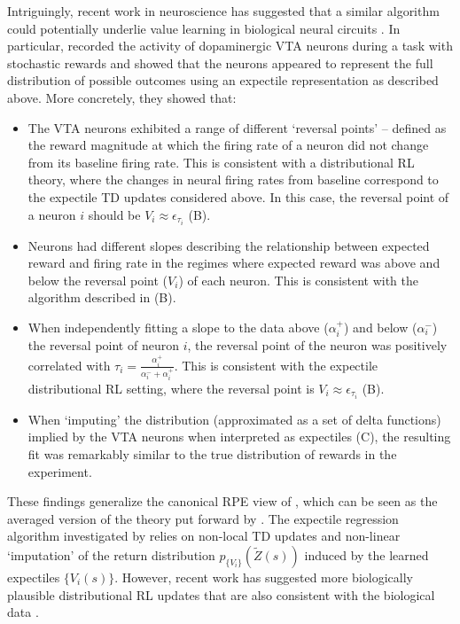 Intriguingly, recent work in neuroscience has suggested that a similar algorithm could potentially underlie value learning in biological neural circuits \citep{dabney2020distributional,lowet2020distributional}.
In particular, \citet{dabney2020distributional} recorded the activity of dopaminergic VTA neurons during a task with stochastic rewards and showed that the neurons appeared to represent the full distribution of possible outcomes using an expectile representation as described above.
More concretely, they showed that:
\begin{itemize}
    \item The VTA neurons exhibited a range of different `reversal points' -- defined as the reward magnitude at which the firing rate of a neuron did not change from its baseline firing rate.
    This is consistent with a distributional RL theory, where the changes in neural firing rates from baseline correspond to the expectile TD updates considered above.
    In this case, the reversal point of a neuron $i$ should be $V_i \approx \epsilon_{\tau_i}$ (B).
    \item Neurons had different slopes describing the relationship between expected reward and firing rate in the regimes where expected reward was above and below the reversal point ($V_i$) of each neuron.
    This is consistent with the algorithm described in  (B).
    \item When independently fitting a slope to the data above ($\alpha_i^+$) and below ($\alpha_i^-$) the reversal point of neuron $i$, the reversal point of the neuron was positively correlated with $\tau_i = \frac{\alpha_i^{+}}{\alpha_i^- + \alpha_i^+}$.
    This is consistent with the expectile distributional RL setting, where the reversal point is $V_i \approx \epsilon_{\tau_i}$ (B).
    \item When `imputing' the distribution (approximated as a set of delta functions) implied by the VTA neurons when interpreted as expectiles (C), the resulting fit was remarkably similar to the true distribution of rewards in the experiment.
\end{itemize}
These findings generalize the canonical RPE view of \citet{schultz1997neural}, which can be seen as the averaged version of the theory put forward by \citet{dabney2020distributional}.
The expectile regression algorithm investigated by \citet{dabney2020distributional} relies on non-local TD updates and non-linear `imputation' of the return distribution $p_{\{ V_i \} }(\tilde{Z}(s))$ induced by the learned expectiles $\{ V_i(s) \}$. 
However, recent work has suggested more biologically plausible distributional RL updates that are also consistent with the biological data \citep{tano2020local}.
